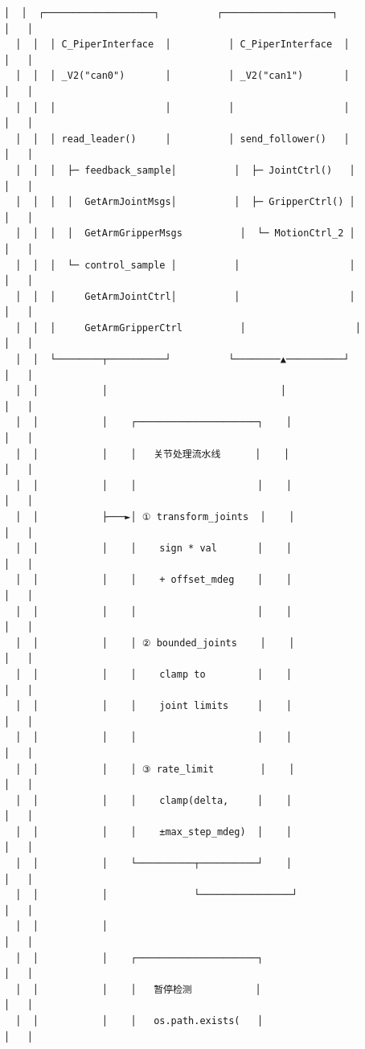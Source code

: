 \documentclass[UTF8,a4paper,11pt]{ctexart}
\begin{document}
{\begin{lstlisting}[language=text]
  │  │  ┌───────────────────┐          ┌───────────────────┐            │   │
  │  │  │ C_PiperInterface  │          │ C_PiperInterface  │            │   │
  │  │  │ _V2("can0")       │          │ _V2("can1")       │            │   │
  │  │  │                   │          │                   │            │   │
  │  │  │ read_leader()     │          │ send_follower()   │            │   │
  │  │  │  ├─ feedback_sample│          │  ├─ JointCtrl()   │            │   │
  │  │  │  │  GetArmJointMsgs│          │  ├─ GripperCtrl() │            │   │
  │  │  │  │  GetArmGripperMsgs          │  └─ MotionCtrl_2 │            │   │
  │  │  │  └─ control_sample │          │                   │            │   │
  │  │  │     GetArmJointCtrl│          │                   │            │   │
  │  │  │     GetArmGripperCtrl          │                   │            │   │
  │  │  └────────┬──────────┘          └────────▲──────────┘            │   │
  │  │           │                              │                        │   │
  │  │           │    ┌─────────────────────┐    │                        │   │
  │  │           │    │   关节处理流水线      │    │                        │   │
  │  │           │    │                     │    │                        │   │
  │  │           ├───►│ ① transform_joints  │    │                        │   │
  │  │           │    │    sign * val       │    │                        │   │
  │  │           │    │    + offset_mdeg    │    │                        │   │
  │  │           │    │                     │    │                        │   │
  │  │           │    │ ② bounded_joints    │    │                        │   │
  │  │           │    │    clamp to         │    │                        │   │
  │  │           │    │    joint limits     │    │                        │   │
  │  │           │    │                     │    │                        │   │
  │  │           │    │ ③ rate_limit        │    │                        │   │
  │  │           │    │    clamp(delta,     │    │                        │   │
  │  │           │    │    ±max_step_mdeg)  │    │                        │   │
  │  │           │    └──────────┬──────────┘    │                        │   │
  │  │           │               └────────────────┘                        │   │
  │  │           │                                                        │   │
  │  │           │    ┌─────────────────────┐                              │   │
  │  │           │    │   暂停检测           │                              │   │
  │  │           │    │   os.path.exists(   │                              │   │

\end{lstlisting}}
\end{document}

